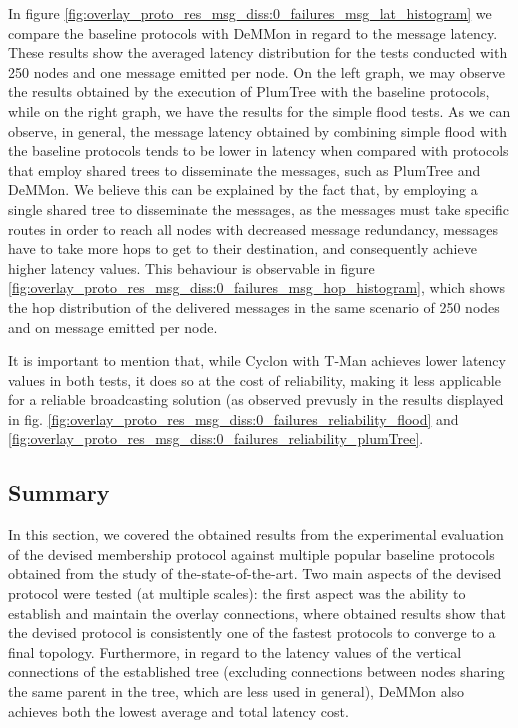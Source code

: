 In figure \ref{fig:overlay_proto_res_msg_diss:0_failures_msg_lat_histogram} we compare the baseline protocols with DeMMon in regard to the message latency. These results show the averaged latency distribution for the tests conducted with 250 nodes and one message emitted per node. On the left graph, we may observe the results obtained by the execution of PlumTree with the baseline protocols, while on the right graph, we have the results for the simple flood tests. As we can observe, in general, the message latency obtained by combining simple flood with the baseline protocols tends to be lower in latency when compared with protocols that employ shared trees to disseminate the messages, such as PlumTree and DeMMon. We believe this can be explained by the fact that, by employing a single shared tree to disseminate the messages, as the messages must take specific routes in order to reach all nodes with decreased message redundancy, messages have to take more hops to get to their destination, and consequently achieve higher latency values. This behaviour is observable in figure \ref{fig:overlay_proto_res_msg_diss:0_failures_msg_hop_histogram}, which shows the hop distribution of the delivered messages in the same scenario of 250 nodes and on message emitted per node.

It is important to mention that, while Cyclon with T-Man achieves lower latency values in both tests, it does so at the cost of reliability, making it less applicable for a reliable broadcasting solution (as observed prevusly in the results displayed in fig. \ref{fig:overlay_proto_res_msg_diss:0_failures_reliability_flood} and \ref{fig:overlay_proto_res_msg_diss:0_failures_reliability_plumTree}.


\subsection{Summary}

In this section, we covered the obtained results from the experimental evaluation of the devised membership protocol against multiple popular baseline protocols obtained from the study of the-state-of-the-art. Two main aspects of the devised protocol were tested (at multiple scales): the first aspect was the ability to establish and maintain the overlay connections, where obtained results show that the devised protocol is consistently one of the fastest protocols to converge to a final topology. Furthermore, in regard to the latency values of the vertical connections of the established tree (excluding connections between nodes sharing the same parent in the tree, which are less used in general), DeMMon also achieves both the lowest average and total latency cost.

